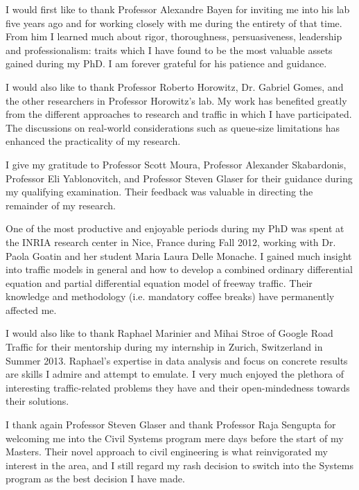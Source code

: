 I would first like to thank Professor Alexandre Bayen for inviting me into his lab five years ago and for working closely with me during the entirety of that time. From him I learned much about rigor, thoroughness, persuasiveness, leadership and professionalism: traits which I have found to be the most valuable assets gained during my PhD. I am forever grateful for his patience and guidance.

I would also like to thank Professor Roberto Horowitz, Dr. Gabriel Gomes, and the other researchers in Professor Horowitz's lab. My work has benefited greatly from the different approaches to research and traffic in which I have participated. The discussions on real-world considerations such as queue-size limitations has enhanced the practicality of my research.

I give my gratitude to Professor Scott Moura, Professor Alexander Skabardonis, Professor Eli Yablonovitch, and Professor Steven Glaser for their guidance during my qualifying examination. Their feedback was valuable in directing the remainder of my research.

One of the most productive and enjoyable periods during my PhD was spent at the INRIA research center in Nice, France during Fall 2012, working with Dr. Paola Goatin and her student Maria Laura Delle Monache. I gained much insight into traffic models in general and how to develop a combined ordinary differential equation and partial differential equation model of freeway traffic. Their knowledge and methodology (i.e. mandatory coffee breaks) have permanently affected me.

I would also like to thank Raphael Marinier and Mihai Stroe of Google Road Traffic for their mentorship during my internship in Zurich, Switzerland in Summer 2013. Raphael's expertise in data analysis and focus on concrete results are skills I admire and attempt to emulate. I very much enjoyed the plethora of interesting traffic-related problems they have and their open-mindedness towards their solutions.

I thank again Professor Steven Glaser and thank Professor Raja Sengupta for welcoming me into the Civil Systems program mere days before the start of my Masters. Their novel approach to civil engineering is what reinvigorated my interest in the area, and I still regard my rash decision to switch into the Systems program as the best decision I have made.

